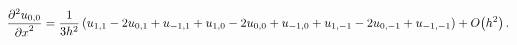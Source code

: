 \[\frac{{\partial}^{2}u_{0,0}}{{\partial x}^{2}}=\frac{1}{3h^{2}}\,(u_{1,1}-2u_{%
0,1}+u_{-1,1}+u_{1,0}-2u_{0,0}+u_{-1,0}+u_{1,-1}-2u_{0,-1}+u_{-1,-1})+\mathop{%
O\/}\nolimits\!\left(h^{2}\right).\]